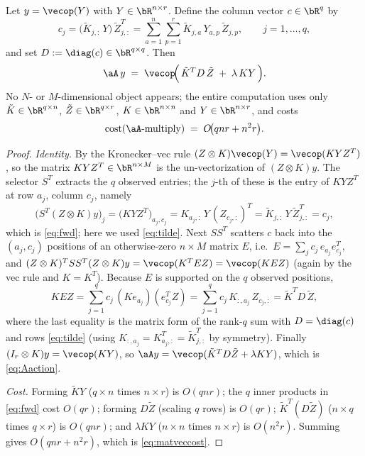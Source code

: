 \begin{lemma}\label{lem:matvec}
Let $y=\vecop(Y)$ with $Y\in\bR^{n\times r}$. Define the column vector
$c\in\bR^{q}$ by
\begin{equation}\label{eq:fwd}
  c_j=\bigl(\tilde K_{j,:}\,Y\bigr)\,\tilde Z_{j,:}^{T}
   =\sum_{a=1}^{n}\sum_{p=1}^{r}\tilde K_{j,a}\,Y_{a,p}\,\tilde Z_{j,p},
   \qquad j=1,\dots,q,
\end{equation}
and set $D:=\diag(c)\in\bR^{q\times q}$. Then
\begin{equation}\label{eq:Aaction}
  \aA\,y
  \;=\;\vecop\!\Bigl(\,\tilde K^{T} D\,\tilde Z \;+\; \lambda\,K Y\,\Bigr).
\end{equation}
No $N$- or $M$-dimensional object appears; the entire computation uses only
$\tilde K\in\bR^{q\times n}$, $\tilde Z\in\bR^{q\times r}$, $K\in\bR^{n\times n}$
and $Y\in\bR^{n\times r}$, and costs
\begin{equation}\label{eq:matveccost}
  \mathrm{cost}(\aA\text{-multiply})
  \;=\; O\!\bigl(qnr + n^{2}r\bigr).
\end{equation}
\end{lemma}

\begin{proof}
\emph{Identity.} By the Kronecker--vec rule
$(Z\otimes K)\vecop(Y)=\vecop(KYZ^{T})$, so the matrix $KYZ^{T}\in\bR^{n\times M}$
is the un-vectorization of $(Z\otimes K)y$. The selector $S^{T}$ extracts the
$q$ observed entries; the $j$-th of these is the entry of $KYZ^{T}$ at row $a_j$,
column $c_j$, namely
\[
  \bigl(S^{T}(Z\otimes K)y\bigr)_j
  =\bigl(KYZ^{T}\bigr)_{a_j,c_j}
  =K_{a_j,:}\,Y\,(Z_{c_j,:})^{T}
  =\tilde K_{j,:}\,Y\,\tilde Z_{j,:}^{T}=c_j,
\]
which is \eqref{eq:fwd}; here we used \eqref{eq:tilde}. Next $SS^{T}$ scatters
$c$ back into the $(a_j,c_j)$ positions of an otherwise-zero $n\times M$ matrix
$E$, i.e.\ $E=\sum_{j}c_j\,e_{a_j}e_{c_j}^{T}$, and
$(Z\otimes K)^{T}SS^{T}(Z\otimes K)y=\vecop(K^{T}EZ)=\vecop(KEZ)$ (again by the
vec rule and $K=K^{T}$). Because $E$ is supported on the $q$ observed positions,
\[
  KEZ=\sum_{j=1}^{q}c_j\,(Ke_{a_j})(e_{c_j}^{T}Z)
     =\sum_{j=1}^{q}c_j\,K_{:,a_j}\,Z_{c_j,:}
     =\tilde K^{T}D\,\tilde Z,
\]
where the last equality is the matrix form of the rank-$q$ sum with
$D=\diag(c)$ and rows \eqref{eq:tilde} (using $K_{:,a_j}=K_{a_j,:}^{T}=\tilde
K_{j,:}^{T}$ by symmetry). Finally
$(I_r\otimes K)y=\vecop(KY)$, so
$\aA y=\vecop(\tilde K^{T}D\tilde Z+\lambda KY)$, which is \eqref{eq:Aaction}.

\smallskip
\emph{Cost.} Forming $\tilde K Y$ ($q\times n$ times $n\times r$) is $O(qnr)$;
the $q$ inner products in \eqref{eq:fwd} cost $O(qr)$; forming $D\tilde Z$
(scaling $q$ rows) is $O(qr)$; $\tilde K^{T}(D\tilde Z)$
($n\times q$ times $q\times r$) is $O(qnr)$; and $\lambda KY$
($n\times n$ times $n\times r$) is $O(n^{2}r)$. Summing gives
$O(qnr+n^{2}r)$, which is \eqref{eq:matveccost}.
\end{proof}

